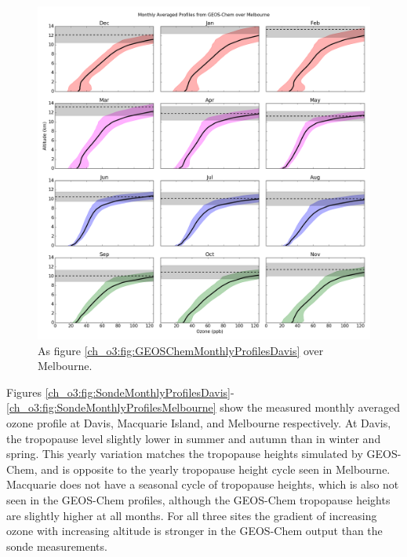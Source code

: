     \begin{figure}[!htbp]
      \includegraphics[width=\textwidth]{Figures/Ozone/Melbourne_GC_monthprofiles.png}
      \caption{As figure \ref{ch_o3:fig:GEOSChemMonthlyProfilesDavis} over Melbourne.}
      \label{ch_o3:fig:GEOSChemMonthlyProfilesMelbourne}
    \end{figure}
    
    Figures \ref{ch_o3:fig:SondeMonthlyProfilesDavis}-\ref{ch_o3:fig:SondeMonthlyProfilesMelbourne} show the measured monthly averaged ozone profile at Davis, Macquarie Island, and Melbourne respectively.
    At Davis, the tropopause level slightly lower in summer and autumn than in winter and spring.
    This yearly variation matches the tropopause heights simulated by GEOS-Chem, and is opposite to the yearly tropopause height cycle seen in Melbourne.
    Macquarie does not have a seasonal cycle of tropopause heights, which is also not seen in the GEOS-Chem profiles, although the GEOS-Chem tropopause heights are slightly higher at all months.
    For all three sites the gradient of increasing ozone with increasing altitude is stronger in the GEOS-Chem output than the sonde measurements.
    
